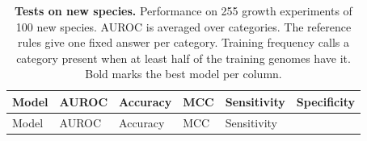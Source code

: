 \documentclass[10pt,a4paper,onecolumn]{article}
\begin{document}
\begin{longtable}[]{@{}
  >{\raggedright\arraybackslash}p{}
  >{\raggedleft\arraybackslash}p{}
  >{\raggedleft\arraybackslash}p{}
  >{\raggedleft\arraybackslash}p{}
  >{\raggedleft\arraybackslash}p{}
  >{\raggedleft\arraybackslash}p{}@{}}
\caption{\textbf{Tests on new species.} Performance on 255 growth
experiments of 100 new species. AUROC is averaged over categories. The
reference rules give one fixed answer per category. Training frequency
calls a category present when at least half of the training genomes have
it. Bold marks the best model per column.
\label{tab:newspecies}}\tabularnewline
\toprule\noalign{}
\begin{minipage}[b]{\linewidth}\raggedright
Model
\end{minipage} & \begin{minipage}[b]{\linewidth}\raggedleft
AUROC
\end{minipage} & \begin{minipage}[b]{\linewidth}\raggedleft
Accuracy
\end{minipage} & \begin{minipage}[b]{\linewidth}\raggedleft
MCC
\end{minipage} & \begin{minipage}[b]{\linewidth}\raggedleft
Sensitivity
\end{minipage} & \begin{minipage}[b]{\linewidth}\raggedleft
Specificity
\end{minipage} \\
\midrule\noalign{}
\endfirsthead
\toprule\noalign{}
\begin{minipage}[b]{\linewidth}\raggedright
Model
\end{minipage} & \begin{minipage}[b]{\linewidth}\raggedleft
AUROC
\end{minipage} & \begin{minipage}[b]{\linewidth}\raggedleft
Accuracy
\end{minipage} & \begin{minipage}[b]{\linewidth}\raggedleft
MCC
\end{minipage} & \begin{minipage}[b]{\linewidth}\raggedleft
Sensitivity
\end{minipage} & \begin{minipage}[b]{\linewidth}\raggedleft

\end{minipage}
\end{longtable}
\end{document}
